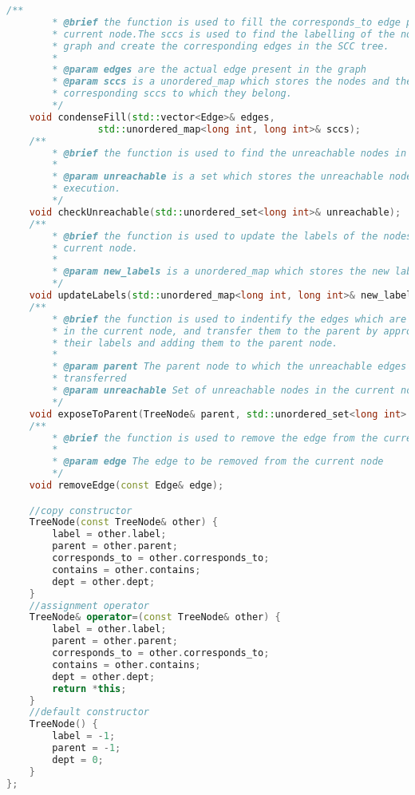 \begin{lstlisting}[language=C++, caption={SCC-Tree Node}, label={lst:scc_tree_node}]
    /**
        * @brief the function is used to fill the corresponds_to edge pairs for the 
        * current node.The sccs is used to find the labelling of the nodes in the 
        * graph and create the corresponding edges in the SCC tree.
        * 
        * @param edges are the actual edge present in the graph
        * @param sccs is a unordered_map which stores the nodes and their 
        * corresponding sccs to which they belong.
        */
    void condenseFill(std::vector<Edge>& edges, 
                std::unordered_map<long int, long int>& sccs);
    /**
        * @brief the function is used to find the unreachable nodes in the current node.
        * 
        * @param unreachable is a set which stores the unreachable nodes after its 
        * execution.
        */
    void checkUnreachable(std::unordered_set<long int>& unreachable);
    /**
        * @brief the function is used to update the labels of the nodes in the 
        * current node.
        * 
        * @param new_labels is a unordered_map which stores the new labels of the nodes.
        */
    void updateLabels(std::unordered_map<long int, long int>& new_labels);
    /**
        * @brief the function is used to indentify the edges which are unreachable 
        * in the current node, and transfer them to the parent by appropriately updating
        * their labels and adding them to the parent node.
        * 
        * @param parent The parent node to which the unreachable edges are to be 
        * transferred
        * @param unreachable Set of unreachable nodes in the current node
        */
    void exposeToParent(TreeNode& parent, std::unordered_set<long int> unreachable);
    /**
        * @brief the function is used to remove the edge from the current node.
        * 
        * @param edge The edge to be removed from the current node
        */
    void removeEdge(const Edge& edge);

    //copy constructor
    TreeNode(const TreeNode& other) {
        label = other.label;
        parent = other.parent;
        corresponds_to = other.corresponds_to;
        contains = other.contains;
        dept = other.dept;
    }
    //assignment operator
    TreeNode& operator=(const TreeNode& other) {
        label = other.label;
        parent = other.parent;
        corresponds_to = other.corresponds_to;
        contains = other.contains;
        dept = other.dept;
        return *this;
    }
    //default constructor
    TreeNode() {
        label = -1;
        parent = -1;
        dept = 0;
    }
};
\end{lstlisting}

